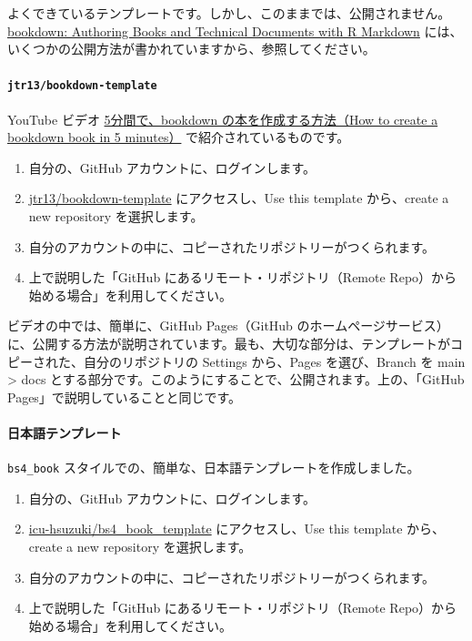 \documentclass[
  xelatex, ja=standard]{bxjsbook}
\providecommand{\tightlist}{%
  \setlength{\itemsep}{0pt}\setlength{\parskip}{0pt}}
\theoremstyle{definition}
\theoremstyle{definition}
\theoremstyle{definition}
\theoremstyle{definition}
\theoremstyle{remark}
\begin{document}
よくできているテンプレートです。しかし、このままでは、公開されません。\href{https://bookdown.org/yihui/bookdown/}{bookdown: Authoring Books and Technical Documents with R Markdown} には、いくつかの公開方法が書かれていますから、参照してください。

\hypertarget{jtr13bookdown-template}{%
\paragraph{\texorpdfstring{\texttt{jtr13/bookdown-template}}{jtr13/bookdown-template}}\label{jtr13bookdown-template}}

YouTube ビデオ \href{https://www.youtube.com/watch?v=m5D-yoH416Y}{5分間で、bookdown の本を作成する方法（How to create a bookdown book in 5 minutes）} で紹介されているものです。

\begin{enumerate}
\def\labelenumi{\arabic{enumi}.}
\tightlist
\item
  自分の、GitHub アカウントに、ログインします。
\item
  \href{https://github.com/jtr13/bookdown-template}{jtr13/bookdown-template} にアクセスし、Use this template から、create a new repository を選択します。
\item
  自分のアカウントの中に、コピーされたリポジトリーがつくられます。
\item
  上で説明した「GitHub にあるリモート・リポジトリ（Remote Repo）から始める場合」を利用してください。
\end{enumerate}

ビデオの中では、簡単に、GitHub Pages（GitHub のホームページサービス）に、公開する方法が説明されています。最も、大切な部分は、テンプレートがコピーされた、自分のリポジトリの Settings から、Pages を選び、Branch を main \textgreater{} docs とする部分です。このようにすることで、公開されます。上の、「GitHub Pages」で説明していることと同じです。

\hypertarget{ux65e5ux672cux8a9eux30c6ux30f3ux30d7ux30ecux30fcux30c8}{%
\paragraph{日本語テンプレート}\label{ux65e5ux672cux8a9eux30c6ux30f3ux30d7ux30ecux30fcux30c8}}

\texttt{bs4\_book} スタイルでの、簡単な、日本語テンプレートを作成しました。

\begin{enumerate}
\def\labelenumi{\arabic{enumi}.}
\tightlist
\item
  自分の、GitHub アカウントに、ログインします。
\item
  \href{https://github.com/icu-hsuzuki/bs4_book_template}{icu-hsuzuki/bs4\_book\_template} にアクセスし、Use this template から、create a new repository を選択します。
\item
  自分のアカウントの中に、コピーされたリポジトリーがつくられます。
\item
  上で説明した「GitHub にあるリモート・リポジトリ（Remote Repo）から始める場合」を利用してください。
\end{enumerate}
\end{document}
